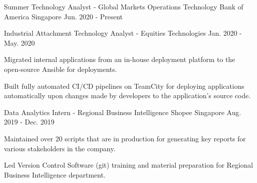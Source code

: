 

\begin{cventries}

  \cventry
	{Summer Technology Analyst - Global Markets Operations Technology} %
	{Bank of America} %
	{Singapore} %
	{Jun. 2020 - Present} %
	{
      \begin{cvitems} %
	  \end{cvitems}
	}

  \cventry
    {Industrial Attachment Technology Analyst - Equities Technologies} %
    {} %
    {} %
    {Jan. 2020 - May. 2020} %
    {
      \begin{cvitems} %
        \item {Migrated internal applications from an in-house deployment platform to the open-source Ansible for deployments.}
        \item {Built fully automated CI/CD pipelines on TeamCity for deploying applications automatically upon changes made by developers to the application's source code.}
      \end{cvitems}
    }



  \cventry
    {Data Analytics Intern - Regional Business Intelligence} %
    {Shopee} %
    {Singapore} %
    {Aug. 2019 - Dec. 2019} %
    {
      \begin{cvitems} %
        \item {Maintained over 20 scripts that are in production for generating key reports for various stakeholders in the company.}
        \item {Led Version Control Software (git) training and material preparation for Regional Business Intelligence department.}
      \end{cvitems}
    }


\end{cventries}
